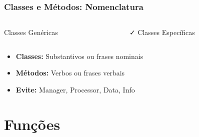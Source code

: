 \documentclass[aspectratio=169]{beamer}
\begin{document}
\begin{frame}
\frametitle{Classes e Métodos: Nomenclatura}

\begin{columns}
\begin{column}{0.5\textwidth}
\begin{block}{\textcolor{cleanred}{\faTimes} Classes Genéricas}

\end{block}
\end{column}

\begin{column}{0.5\textwidth}
\begin{block}{\textcolor{cleangreen}{\faCheck} Classes Específicas}

\end{block}
\end{column}
\end{columns}

\vspace{0.5cm}
\begin{itemize}
    \item \textbf{Classes:} Substantivos ou frases nominais
    \item \textbf{Métodos:} Verbos ou frases verbais
    \item \textbf{Evite:} Manager, Processor, Data, Info
\end{itemize}
\end{frame}

\section{Funções}
\end{document}
